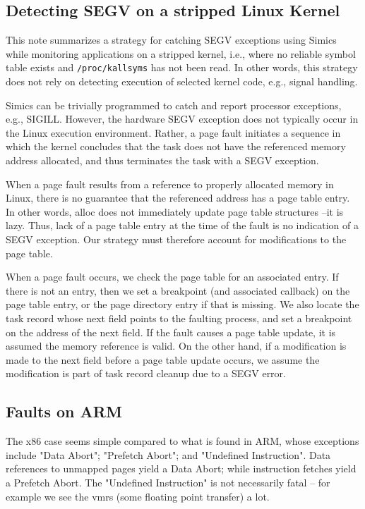 \documentclass[titlepage]{article}
\begin{document}
\begin{appendices}
\section{Detecting SEGV on a stripped Linux Kernel}
\label{SEGV}
This note summarizes a strategy for catching SEGV exceptions using Simics while monitoring applications on a stripped kernel, i.e., where no reliable symbol table exists and {\tt /proc/kallsyms} has not been read.  In other words, this strategy does not rely on detecting execution of selected kernel code, e.g., signal handling.

Simics can be trivially programmed to catch and report processor exceptions, e.g., SIGILL.  However, the hardware SEGV exception does not typically occur in the Linux execution environment.  Rather, a page fault initiates a sequence in which the kernel concludes that the task does not have the referenced memory address allocated, and thus terminates the task with a SEGV exception.

When a page fault results from a reference to properly allocated memory in Linux, there is no guarantee that the referenced address has a page table entry. In other words, alloc does not immediately update page table structures --it is lazy.  Thus, lack of a page table entry at the time of the fault is no indication of a SEGV exception.  Our strategy must therefore account for modifications to the page table.

When a page fault occurs, we check the page table for an associated entry. If there is not an entry, then we set a breakpoint (and associated callback) on the page table entry, or the page directory entry if that is missing.  We also locate the task record whose next field points to the faulting process, and set a breakpoint on the address of the next field.  If the fault causes a page table update, it is assumed the memory reference is valid.  On the other hand, if a modification is made to the next field before a page table update occurs, we assume the modification is part of task record cleanup due to a SEGV error.

\subsection{Faults on ARM}
The x86 case seems simple compared to what is found in ARM, whose exceptions include "Data Abort"; "Prefetch Abort"; and "Undefined Instruction".  
Data references to unmapped pages yield a Data Abort; while instruction fetches yield a Prefetch Abort.  The "Undefined Instruction" is not necessarily fatal --
for example we see the vmrs (some floating point transfer) a lot.


\end{appendices}
\end{document}
